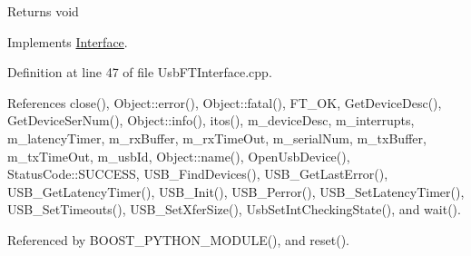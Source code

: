 \begin{DoxyReturn}{Returns}
void 
\end{DoxyReturn}


Implements \hyperlink{classInterface_a1d095c113b1e89d1f5f68323856fee63}{Interface}.

Definition at line 47 of file UsbFTInterface.cpp.

References close(), Object::error(), Object::fatal(), FT\_\-OK, GetDeviceDesc(), GetDeviceSerNum(), Object::info(), itos(), m\_\-deviceDesc, m\_\-interrupts, m\_\-latencyTimer, m\_\-rxBuffer, m\_\-rxTimeOut, m\_\-serialNum, m\_\-txBuffer, m\_\-txTimeOut, m\_\-usbId, Object::name(), OpenUsbDevice(), StatusCode::SUCCESS, USB\_\-FindDevices(), USB\_\-GetLastError(), USB\_\-GetLatencyTimer(), USB\_\-Init(), USB\_\-Perror(), USB\_\-SetLatencyTimer(), USB\_\-SetTimeouts(), USB\_\-SetXferSize(), UsbSetIntCheckingState(), and wait().

Referenced by BOOST\_\-PYTHON\_\-MODULE(), and reset().


